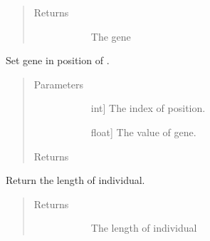 \documentclass[letterpaper,10pt,english]{sphinxmanual}
\begin{document}
\begin{fulllineitems}
\begin{fulllineitems}
\begin{quote}
\begin{description}
\begin{description}
\end{description}

\item[{Returns}] \leavevmode\begin{description}
\item[{}] \leavevmode
The gene

\end{description}

\end{description}\end{quote}

\end{fulllineitems}


\begin{fulllineitems}
\label{\detokenize{pygace:pygace.ga.Individual.set_gene}}
Set gene in position of .
\begin{quote}\begin{description}
\item[{Parameters}] \leavevmode\begin{description}
\item[{}] \leavevmode{[}int{]}
The index of position.

\item[{}] \leavevmode{[}float{]}
The value of gene.

\end{description}

\item[{Returns}] \leavevmode\begin{description}
\item[{}] \leavevmode
\end{description}

\end{description}\end{quote}

\end{fulllineitems}


\begin{fulllineitems}
\label{\detokenize{pygace:pygace.ga.Individual.size}}
Return the length of individual.
\begin{quote}\begin{description}
\item[{Returns}] \leavevmode\begin{description}
\item[{}] \leavevmode
The length of individual


\end{description}
\end{description}
\end{quote}
\end{fulllineitems}
\end{fulllineitems}
\end{document}
